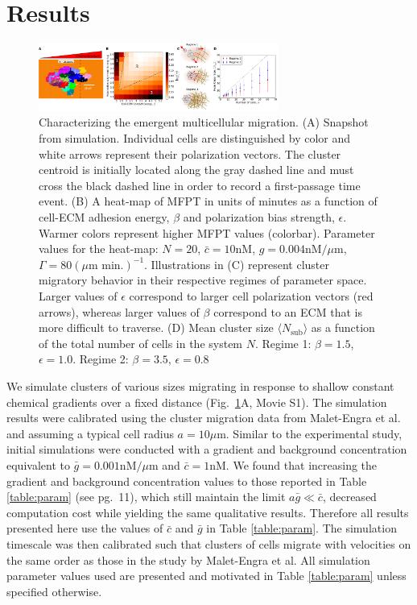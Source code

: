 \section{Results}


\begin{figure}[t]
    \centering
        \includegraphics[width=0.7\textwidth]{../fig/ch2_fig2.png}
    \caption{Characterizing the emergent multicellular migration. (A) Snapshot from simulation. Individual cells are distinguished by color and white arrows represent their polarization vectors. The cluster centroid is initially located along the gray dashed line and must cross the black dashed line in order to record a first-passage time event. (B) A heat-map of MFPT in units of minutes as a function of cell-ECM adhesion energy, $\beta$ and polarization bias strength, $\epsilon$. Warmer colors represent higher MFPT values (colorbar). Parameter values for the heat-map: $N = 20$, $\bar{c} = 10\text{nM}$, $g = 0.004\text{nM}/\mu\text{m}$, $\Gamma = 80 (\mu\text{m min.})^{-1}$. Illustrations in (C) represent cluster migratory behavior in their respective regimes of parameter space. Larger values of $\epsilon$ correspond to larger cell polarization vectors (red arrows), whereas larger values of $\beta$ correspond to an ECM that is more difficult to traverse. (D) Mean cluster size
    $\langle N_\text{sub} \rangle$
    as a function of the total number of cells in the system $N$. Regime 1: $\beta = 1.5$, $\epsilon = 1.0$. Regime 2: $\beta = 3.5$, $\epsilon = 0.8$} \label{fig:heat}
\end{figure}


We simulate clusters of various sizes migrating in response to shallow constant chemical gradients over a fixed distance (Fig.\ \ref{fig:heat}A, Movie S1). The simulation results were calibrated using the cluster migration data from Malet-Engra et al.\ \cite{malet2015collective} and assuming a typical cell radius $a = 10 \mu\text{m}$. Similar to the experimental study, initial simulations were conducted with a gradient and background concentration equivalent to $\bar{g} = 0.001 \text{nM}/\mu\text{m}$ and $\bar{c} = 1 \text{nM}$. We found that increasing the gradient and background concentration values to those reported in Table \ref{table:param} (see pg.\ 11), which still maintain the limit
$a\bar{g} \ll \bar{c}$,
decreased computation cost while yielding the same qualitative results. Therefore all results presented here use the values of $\bar{c}$ and $\bar{g}$ in Table \ref{table:param}. The simulation timescale was then calibrated such that clusters of cells migrate with velocities on the same order as those in the study by Malet-Engra et al. All simulation parameter values used are presented and motivated in Table \ref{table:param} unless specified otherwise.

